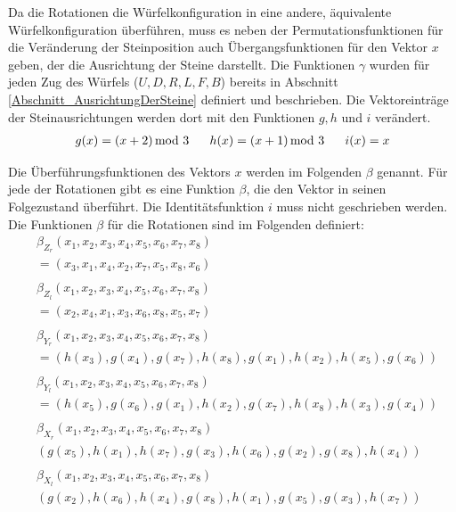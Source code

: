 \documentclass[12pt,a4paper, usenames, dvipsnames]{article}
\theoremstyle{mystyle}
\theoremstyle{definition}
\begin{document}
Da die Rotationen die Würfelkonfiguration in eine andere, äquivalente Würfelkonfiguration überführen, muss es neben der Permutationsfunktionen für die Veränderung der Steinposition auch Übergangsfunktionen für den Vektor $x$ geben, der die Ausrichtung der Steine darstellt. Die Funktionen $\gamma$ wurden für jeden Zug des Würfels ($U, D, R, L, F, B$) bereits in Abschnitt \ref{Abschnitt_AusrichtungDerSteine} definiert und beschrieben. Die Vektoreinträge der Steinausrichtungen werden dort mit den Funktionen $g, h$ und $i$ verändert.
\begin{align*}
g(x)=(x + 2) \hspace*{-0.5em} \mod 3 \ \ \ \ \ h(x) = (x+1) \hspace*{-0.5em} \mod 3 \ \ \ \ \ i(x)=x
\end{align*}

Die Überführungsfunktionen des Vektors $x$ werden im Folgenden $\beta$ genannt. Für jede der Rotationen gibt es eine Funktion $\beta$, die den Vektor in seinen Folgezustand überführt. Die Identitätsfunktion $i$ muss nicht geschrieben werden. Die Funktionen $\beta$ für die Rotationen sind im Folgenden definiert:
\begin{align*}
 & \beta_{Z_r}(x_1, x_2, x_3, x_4, x_5,x_6,x_7,x_8) \\
 & = (x_3, x_1, x_4, x_2, x_7, x_5, x_8, x_6) \\
\\
 & \beta_{Z_l}(x_1, x_2, x_3, x_4, x_5,x_6,x_7,x_8) \\
 & = (x_2, x_4, x_1, x_3, x_6, x_8, x_5, x_7) \\
\\
 & \beta_{Y_r}(x_1, x_2, x_3, x_4, x_5,x_6,x_7,x_8) \\
 & = (h(x_3), g(x_4), g(x_7), h(x_8), g(x_1), h(x_2), h(x_5), g(x_6)) \\
\\
 & \beta_{Y_l}(x_1, x_2, x_3, x_4, x_5,x_6,x_7,x_8) \\
 & = (h(x_5), g(x_6), g(x_1), h(x_2),g(x_7),h(x_8),h(x_3),g(x_4)) \\
\\
 & \beta_{X_r}(x_1, x_2, x_3, x_4, x_5,x_6,x_7,x_8) \\
 & (g(x_5), h(x_1), h(x_7), g(x_3), h(x_6), g(x_2), g(x_8),h(x_4)) \\
\\
 & \beta_{X_l}(x_1, x_2, x_3, x_4, x_5,x_6,x_7,x_8) \\
 & (g(x_2), h(x_6), h(x_4),g(x_8), h(x_1), g(x_5), g(x_3), h(x_7)) 
\end{align*}
\end{document}
